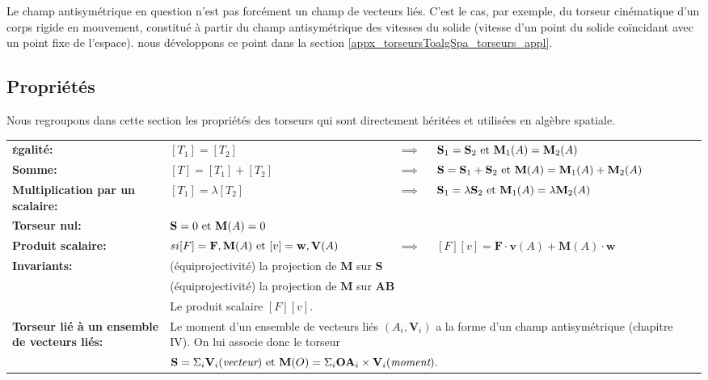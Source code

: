 Le champ antisymétrique en question n'est pas forcément un champ de vecteurs liés. C'est le cas, par exemple, du torseur cinématique d'un corps rigide en mouvement, constitué à partir du champ antisymétrique des vitesses du solide (vitesse d'un point du solide coïncidant avec un point fixe de l'espace). nous développons ce point dans la section \ref{appx_torseursToalgSpa_torseurs_appl}.

\subsection{Propriétés} \label{appx_torseursToalgSpa_torseurs_prop}

Nous regroupons dans cette section les propriétés des torseurs qui sont directement héritées et utilisées en algèbre spatiale.

\begin{flushleft}
\begin{spacing}{1.5}
\begin{tabular}{ l l c p{5cm} }
  \textbf{\textsc{é}galité:}
  & $[T_{1}]=[T_{2}]$ & $\implies$ & $\mathbf{S}_{1}=\mathbf{S}_{2} \textnormal{ et } \mathbf{M}_{1}(A)=\mathbf{M}_{2}(A)$ \\
  \textbf{Somme:}
  & $[T]=[T_{1}]+[T_{2}]$ & $\implies$ & $\mathbf{S}=\mathbf{S}_{1}+\mathbf{S}_{2} \textnormal{ et } \mathbf{M}(A)=\mathbf{M}_{1}(A)+\mathbf{M}_{2}(A)$ \\
  \textbf{Multiplication par un scalaire:}
  & $[T_{1}]=\lambda [T_{2}]$ & $\implies$ & $\mathbf{S}_{1}=\lambda \mathbf{S}_{2} \textnormal{ et } \mathbf{M}_{1}(A)=\lambda \mathbf{M}_{2}(A)$ \\
  \textbf{Torseur nul:}
  & \multicolumn{3}{l}{$\mathbf{S}=0 \textnormal{ et } \mathbf{M}(A)=0$} \\
  \textbf{Produit scalaire:}
  & $si [F]={\mathbf{F},\mathbf{M}(A)} \textnormal{ et } [v]={\mathbf{w},\mathbf{V}(A)}$ & $\implies$ & $[F][v] = \mathbf{F} \cdot \mathbf{v}(A) + \mathbf{M}(A) \cdot \mathbf{w}$ \\
  \textbf{Invariants:}
  & \multicolumn{3}{l}{(équiprojectivité) la projection de $\mathbf{M}$ sur $\mathbf{S}$} \\
  & \multicolumn{3}{l}{(équiprojectivité) la projection de $\mathbf{M}$ sur $\mathbf{AB}$} \\
  & \multicolumn{3}{l}{Le produit scalaire $[F][v]$.} \\
  \multicolumn{1}{p{6cm}}{\textbf{Torseur lié à un ensemble de vecteurs liés:}}
  & \multicolumn{3}{p{10cm}}{Le moment d'un ensemble de vecteurs liés ${(A_{i},\mathbf{V}_{i})}$ a la forme d'un champ antisymétrique \cite{bib_champVecteurs} (chapitre IV). On lui associe donc
  le torseur} \\
  & \multicolumn{3}{l}{$\mathbf{S}=\Sigma_{i}\mathbf{V}_{i} (\emph{vecteur}) \textnormal{ et } \mathbf{M}(O)=\Sigma_{i}\mathbf{OA}_{i} \times \mathbf{V}_{i} (\emph{moment}).$} \\
\end{tabular}
\end{spacing}
\end{flushleft}


